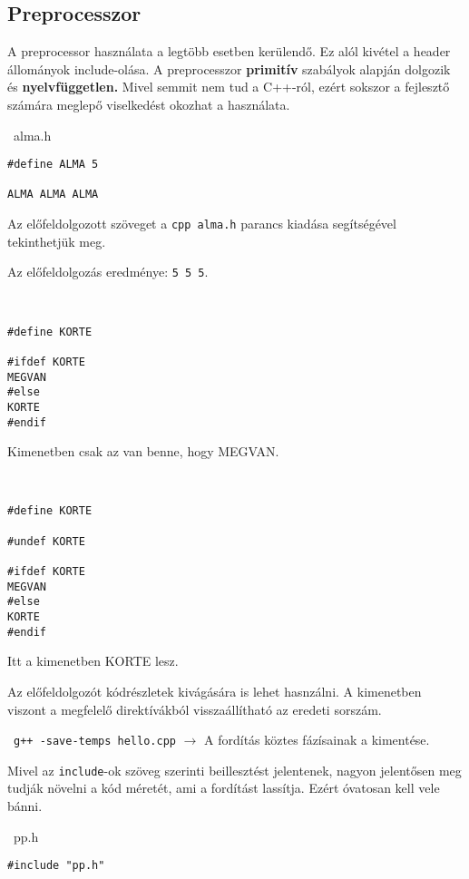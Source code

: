 \documentclass[a4paper,11.5pt]{article}
\begin{document}
	\subsection{Preprocesszor}
	A preprocessor használata a legtöbb esetben kerülendő. Ez alól kivétel a header állományok include-olása. A preprocesszor \textbf{primitív} szabályok alapján dolgozik és \textbf{nyelvfüggetlen.} Mivel semmit nem tud a C++-ról, ezért sokszor a fejlesztő számára meglepő viselkedést okozhat a használata.
	\begin{example}\ 
		alma.h
		\begin{lstlisting}
#define ALMA 5

ALMA ALMA ALMA
		\end{lstlisting}
		Az előfeldolgozott szöveget a \texttt{cpp alma.h} parancs kiadása segítségével tekinthetjük meg.
		
		Az előfeldolgozás eredménye: \texttt{5 5 5}.
	\end{example}
	\begin{example}\
		
		\begin{lstlisting}
#define KORTE

#ifdef KORTE
MEGVAN
#else
KORTE
#endif
		\end{lstlisting}
		Kimenetben csak az van benne, hogy MEGVAN.
	\end{example}
	
	\begin{example}\
		
		\begin{lstlisting}
#define KORTE

#undef KORTE

#ifdef KORTE
MEGVAN
#else
KORTE
#endif
		\end{lstlisting}
		Itt a kimenetben KORTE lesz.
	\end{example}
	Az előfeldolgozót kódrészletek kivágására is lehet hasnzálni. A kimenetben viszont a megfelelő direktívákból visszaállítható az eredeti sorszám.
	\begin{note}\
		\texttt{g++ -save-temps hello.cpp} $\rightarrow$ A fordítás köztes fázísainak a kimentése.
	\end{note}
	Mivel az \texttt{include}-ok szöveg szerinti beillesztést jelentenek, nagyon jelentősen meg tudják növelni a kód méretét, ami a fordítást lassítja. Ezért óvatosan kell vele bánni.
	\begin{example}\ 
		pp.h
		\begin{lstlisting}
#include "pp.h"
		\end{lstlisting}
	\end{example}
		
\end{document}
